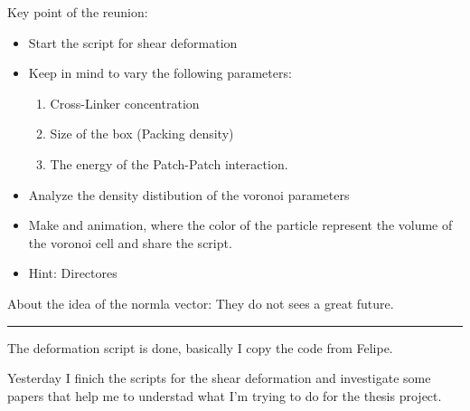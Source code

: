 \documentclass[a4paper, 11pt, oneside]{researchjournal} %
\begin{document}
Key point of the reunion:
\begin{itemize}
	\item Start the script for shear deformation
	\item Keep in mind to vary the following parameters:
	\begin{enumerate}
		\item Cross-Linker concentration
		\item Size of the box (Packing density)
		\item The energy of the Patch-Patch interaction.
	\end{enumerate}
	\item Analyze the density distibution of the voronoi parameters
	\item Make and animation, where the color of the particle represent the volume of the voronoi cell and share the script.
	\item Hint: Directores
\end{itemize}

About the idea of the normla vector: They do not sees a great future.

\rule{\textwidth}{0.4pt}

The deformation script is done, basically I copy the code from Felipe.

Yesterday I finich the scripts for the shear deformation and investigate some papers that help me to understad what I'm trying to do for the thesis project.
\end{document}
